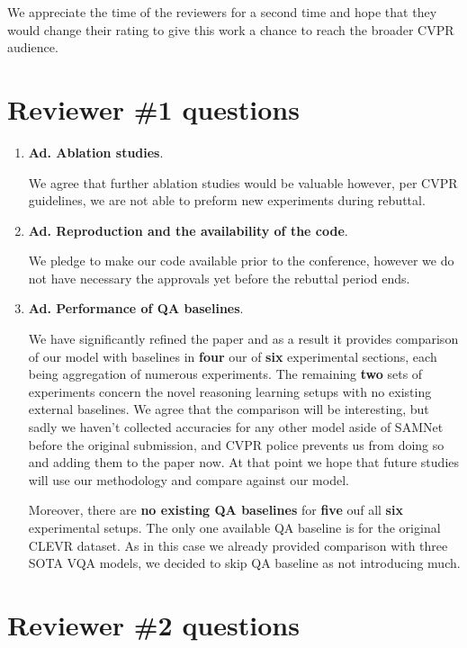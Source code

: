 \documentclass[10pt,twocolumn,letterpaper]{article}
\begin{document}
We appreciate the time of the reviewers for a second time and hope that they would change their rating to give this work a chance to reach the broader CVPR audience.

\section{Reviewer \#1 questions}

\begin{enumerate}
\item \textbf{Ad. Ablation studies}.
	
We agree that further ablation studies would be valuable however, per CVPR guidelines, we are not able to preform new experiments during rebuttal.

\item \textbf{Ad. Reproduction and the availability of the code}.

We pledge to make our code available prior to the conference, however we do not have necessary the approvals yet before the rebuttal period ends.

\item \textbf{Ad. Performance of QA baselines}.

We have significantly refined the paper and as a result it provides comparison of our model with baselines in \textbf{four} our of \textbf{six} experimental sections, each being aggregation of numerous experiments.
The remaining \textbf{two} sets of experiments concern the novel reasoning learning setups with no existing external baselines.
We agree that the comparison will be interesting, but sadly we haven't collected accuracies for any other model aside of SAMNet before the original submission, and CVPR police prevents us from doing so and adding them to the paper now.
At that point we hope that future studies will use our methodology and compare against our model.

Moreover, there are \textbf{no existing QA baselines} for \textbf{five}  ouf all \textbf{six} experimental setups.
The only one available QA baseline is for the original CLEVR dataset.
As in this case we already provided comparison with three SOTA VQA models, we decided to skip QA baseline as not introducing much.

\end{enumerate}

\section{Reviewer \#2 questions}
\end{document}
